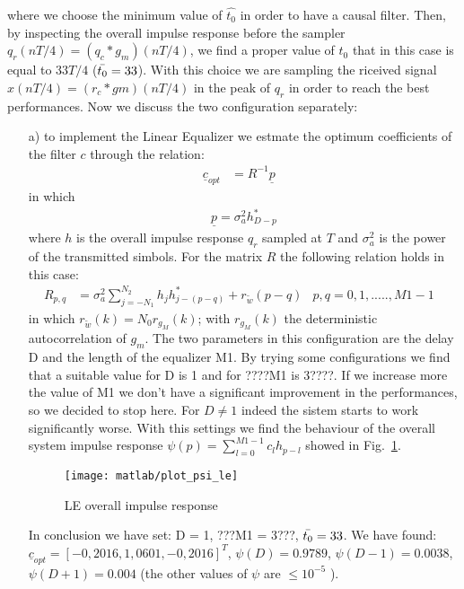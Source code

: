 \documentclass[a4paper,oneside]{article}
\renewcommand{\vec}[1]{\underline{#1}}
\begin{document}
{\color{red}where we choose the minimum value of $\hat{t_0}$} in order to have a causal filter. 
Then, by inspecting the overall impulse response before the sampler $q_r(n T/4) = (q_c * g_m)(n T/4)$, we find a proper value of $t_0$ that in this case is equal to $33T/4$ ($\Bar{t_0} = 33$). With this choice we are sampling the riceived signal $x(nT/4) = (r_c*gm)(nT/4)$ in the peak of $q_r$ {\color{red} in order to reach the best performances}.
Now we discuss the two configuration separately:
\begin{itemize}
\item[a)] to implement the Linear Equalizer we estmate the optimum coefficients of the filter $c$ through the relation:
\begin{align}
\vec{c}_{opt}& = R^{-1} \vec{p}& 
\end{align} 
in which 
\begin{align}
&\vec{p} = \sigma_a^2 h_{D-p}^*&	
\end{align}
where $h$ is the overall impulse response $q_r$ sampled at $T$ and $\sigma_a^2$ is the power of the transmitted simbols. For the matrix $R$ the following relation holds in this case:
\begin{align}
 R_{p,q} &= \sigma^2_a \sum_{j=-N_1}^{N_2}h_jh^*_{j-(p-q)} + r_{\tilde{w}}(p-q) & p,q = 0,1,.....,M1-1&
\end{align}
in which $r_{\tilde{w}}(k) = N_0 r_{g_M}(k)$; with $r_{g_M}(k)$ the deterministic autocorrelation of $g_m$.
The two parameters in this configuration are the delay D and the length of the  equalizer M1. By trying some configurations we find that a suitable value for D is 1 and for ????M1 is 3????. If we increase more the value of M1 we don't have a significant improvement in the performances, so we decided to stop here. {\color{red} For $D\neq 1$ indeed the sistem starts to work significantly worse}. With this settings we find the behaviour of the overall system impulse response $\psi(p) = \sum_{l=0}^{M1-1} c_l h_{p-l}$ showed in Fig.~\ref{plot:psi_le}. 

\begin{figure}[h]
  \centering
  \texttt{[image: matlab/plot\_psi\_le]}
  \caption{LE overall impulse response}
  \label{plot:psi_le}
\end{figure}

\newpage In conclusion we have set: D = 1, ???M1 = 3???, $\Bar{t_0} = 33$. 
\newline We have found: $\vec{c}_{opt} = [-0,2016, 1,0601, -0,2016]^T$,{\color{red} $\psi(D) = 0.9789$, $\psi(D-1) = 0.0038$, $\psi(D+1) = 0.004$ (the other values of $\psi$ are $\leq 10^{-5}$ ).}


\end{itemize}
\end{document}
